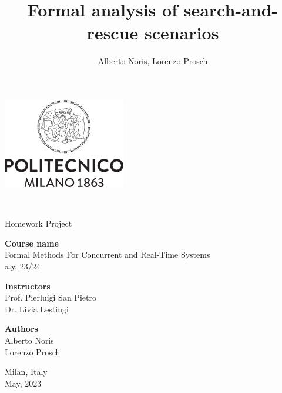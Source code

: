 \documentclass[a4paper,12pt]{article}
\author{Alberto Noris, Lorenzo Prosch}
\title{Formal analysis of search-and-rescue scenarios}
\begin{document}
	
	\begin{center}
		
		\thispagestyle{empty}	%
		
		\includegraphics[width=0.4\textwidth]{root/images/extra/Logo_poli}
		
		\vspace{2cm}
		
		\textbf{\fontsize{28}{\baselineskip}\selectfont {Formal analysis of search-and-rescue scenarios}}\\
		
		\vspace{0.6cm}
		
		\fontsize{17}{\baselineskip}\selectfont Homework Project\\
		
		\vspace{2cm}
		
		\textbf{Course name}\\ 	{
			\setlength{\baselineskip}{1.4\baselineskip}
			Formal Methods For Concurrent and Real-Time Systems\\
			a.y. 23/24\\
		}
		
		\vspace{1cm}
		
		\textbf{Instructors}\\
		{
			\setlength{\baselineskip}{1.4\baselineskip}
			Prof. Pierluigi San Pietro\\
			Dr. Livia Lestingi\\
		}
		
		\vspace{1.5cm}
		
		\textbf{Authors}\\
		{
			\setlength{\baselineskip}{1.4\baselineskip}
			Alberto Noris\\
			Lorenzo Prosch\\
		}
		
		\vspace{1.6cm}
		
		{\scriptsize Milan, Italy \\ May, 2023}
		
	\end{center}
	
	
	\clearpage
	\hypersetup{linkcolor=black}	
	\tableofcontents
	\thispagestyle{empty}
	
	\renewcommand{\rmdefault}{phv}
	\renewcommand{\normalsize}{\fontsize{14}{17.4}\selectfont}

	
	
	
	
	
	
\end{document}
